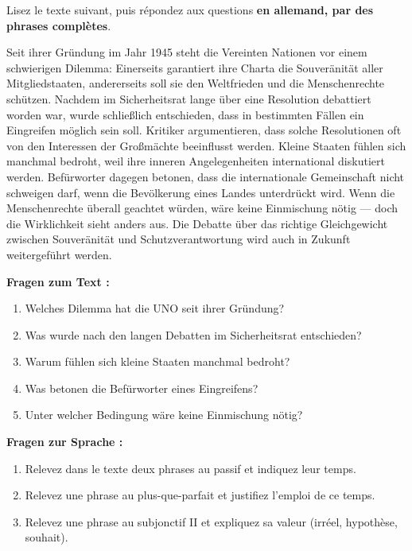 \documentclass[11pt]{article}
\newcounter{popsec}
\newcounter{popsub}
\newcommand{\courssub}[1]{%
  \stepcounter{popsub}%
  \par\vspace{9pt}\noindent{\popxbold\fontsize{11.5}{13}\selectfont\color{popink}{\color{poporange}\thepopsec.\thepopsub}\hspace{6pt}#1}\par\nopagebreak\vspace{4pt}
}
\begin{document}
\courssub{Je me prépare au Bac}

\begin{exercice}
Lisez le texte suivant, puis répondez aux questions \textbf{en allemand, par des phrases complètes}.

\begin{textebox}
Seit ihrer Gründung im Jahr 1945 steht die Vereinten Nationen vor einem schwierigen Dilemma: Einerseits garantiert ihre Charta die Souveränität aller Mitgliedstaaten, andererseits soll sie den Weltfrieden und die Menschenrechte schützen. Nachdem im Sicherheitsrat lange über eine Resolution debattiert worden war, wurde schließlich entschieden, dass in bestimmten Fällen ein Eingreifen möglich sein soll. Kritiker argumentieren, dass solche Resolutionen oft von den Interessen der Großmächte beeinflusst werden. Kleine Staaten fühlen sich manchmal bedroht, weil ihre inneren Angelegenheiten international diskutiert werden. Befürworter dagegen betonen, dass die internationale Gemeinschaft nicht schweigen darf, wenn die Bevölkerung eines Landes unterdrückt wird. Wenn die Menschenrechte überall geachtet würden, wäre keine Einmischung nötig — doch die Wirklichkeit sieht anders aus. Die Debatte über das richtige Gleichgewicht zwischen Souveränität und Schutzverantwortung wird auch in Zukunft weitergeführt werden.
\end{textebox}

\textbf{Fragen zum Text :}
\begin{enumerate}
\item Welches Dilemma hat die UNO seit ihrer Gründung?
\item Was wurde nach den langen Debatten im Sicherheitsrat entschieden?
\item Warum fühlen sich kleine Staaten manchmal bedroht?
\item Was betonen die Befürworter eines Eingreifens?
\item Unter welcher Bedingung wäre keine Einmischung nötig?
\end{enumerate}

\textbf{Fragen zur Sprache :}
\begin{enumerate}
\item Relevez dans le texte deux phrases au passif et indiquez leur temps.
\item Relevez une phrase au plus-que-parfait et justifiez l'emploi de ce temps.
\item Relevez une phrase au subjonctif II et expliquez sa valeur (irréel, hypothèse, souhait).
\end{enumerate}
\end{exercice}
\end{document}
